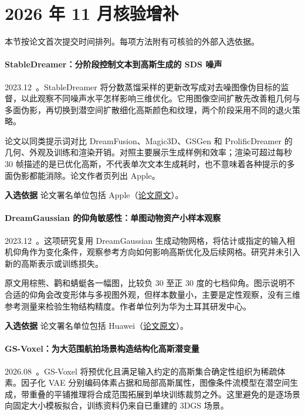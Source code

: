 \section{2026 年 11 月核验增补}

本节按论文首次提交时间排列。每项方法附有可核验的外部入选依据。

\paragraph{StableDreamer：分阶段控制文本到高斯生成的 SDS 噪声}
2023.12~\cite{2312_02189}。StableDreamer 将分数蒸馏采样的更新改写成对去噪图像伪目标的监督，以此观察不同噪声水平怎样影响三维优化。它用图像空间扩散先改善粗几何与多面伪影，再切换到潜空间扩散细化高斯颜色和纹理，两个阶段采用不同的退火策略。

论文以同类提示词对比 DreamFusion、Magic3D、GSGen 和 ProlificDreamer 的几何、外观及训练和渲染开销。对照主要展示生成样例和效率；渲染可超过每秒 30 帧描述的是已优化高斯，不代表单次文本生成耗时，也不意味着各种提示的多面伪影都能消除。论文作者页列出 Apple。

\textbf{入选依据} 论文署名单位包括 Apple（\href{https://arxiv.org/abs/2312.02189}{论文原文}）。

\paragraph{DreamGaussian 的仰角敏感性：单图动物资产小样本观察}
2023.12~\cite{2312_09682}。这项研究复用 DreamGaussian 生成动物网格，将估计或指定的输入相机仰角作为变化条件，观察参考方向如何影响高斯优化及后续网格。研究并未引入新的高斯表示或训练损失。

原文用棕熊、鹳和蜻蜓各一幅图，比较负 30 至正 30 度的七档仰角。图示说明不合适的仰角会改变形体与多视图外观，但样本数量小，主要是定性观察，没有三维参考测量来检验生物结构精度。作者单位列为华为土耳其研发中心。

\textbf{入选依据} 论文署名单位包括 Huawei（\href{https://arxiv.org/abs/2312.09682}{论文原文}）。

\paragraph{GS-Voxel：为大范围航拍场景构造结构化高斯潜变量}
2026.08~\cite{2608_17988}。GS-Voxel 将预优化且满足输入约定的高斯集合确定性组织为稀疏体素。因子化 VAE 分别编码体素占据和局部高斯属性，图像条件流模型在潜空间生成，带重叠的平铺推理将合成范围拓展到单块训练裁剪之外。这里避免的是逐场景向固定大小模板拟合，训练资料仍来自已重建的 3DGS 场景。

